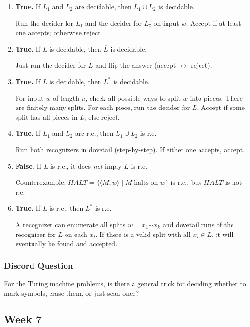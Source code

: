 \documentclass{article}
\theoremstyle{theorem}
\theoremstyle{definition}
\theoremstyle{remark}
\begin{document}
\begin{enumerate}
  \item \textbf{True.} If $L_1$ and $L_2$ are decidable, then $L_1\cup L_2$ is decidable.
  
  Run the decider for $L_1$ and the decider for $L_2$ on input $w$. Accept if at least one accepts; otherwise reject.

  \item \textbf{True.} If $L$ is decidable, then $\overline{L}$ is decidable.
  
  Just run the decider for $L$ and flip the answer (accept $\leftrightarrow$ reject).

  \item \textbf{True.} If $L$ is decidable, then $L^*$ is decidable.
  
  For input $w$ of length $n$, check all possible ways to split $w$ into pieces. There are finitely many splits. For each piece, run the decider for $L$. Accept if some split has all pieces in $L$; else reject.

  \item \textbf{True.} If $L_1$ and $L_2$ are r.e., then $L_1\cup L_2$ is r.e.
  
  Run both recognizers in dovetail (step-by-step). If either one accepts, accept.

  \item \textbf{False.} If $L$ is r.e., it does \emph{not} imply $\overline{L}$ is r.e.
  
  Counterexample: $HALT=\{\langle M,w\rangle\mid M\text{ halts on }w\}$ is r.e., but $\overline{HALT}$ is not r.e.

  \item \textbf{True.} If $L$ is r.e., then $L^*$ is r.e.
  
  A recognizer can enumerate all splits $w=x_1\cdots x_k$ and dovetail runs of the recognizer for $L$ on each $x_i$. If there is a valid split with all $x_i\in L$, it will eventually be found and accepted.
\end{enumerate}

\subsubsection{Discord Question}

For the Turing machine problems, is there a general trick for deciding whether to mark symbols, erase them, or just scan once?

\subsection{Week 7}
\end{document}
